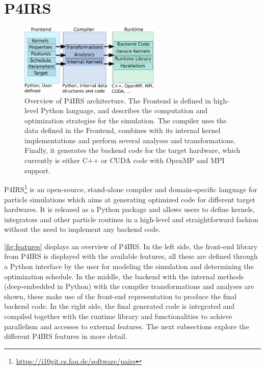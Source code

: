 \documentclass[Afour,sageh,times]{sagej}
\begin{document}
\section{P4IRS}
\label{sec:pairs}


\begin{figure}[htb]
  \centering
  \includegraphics[width=0.6\textwidth]{pairs_overview.png}
  \caption{Overview of P4IRS architecture. The Frontend is defined in high-level Python language, and describes the computation and optimization strategies for the simulation. The compiler uses the data defined in the Frontend, combines with its internal kernel implementations and perform several analyses and transformations. Finally, it generates the backend code for the target hardware, which currently is either C++ or CUDA code with OpenMP and MPI support.}
  \label{fig:features}
\end{figure}

P4IRS\footnote{\url{https://i10git.cs.fau.de/software/pairs}} is an open-source, stand-alone compiler and domain-specific language for particle simulations which aims at generating optimized code for different target hardwares.
It is released as a Python package and allows users to define kernels, integrators and other particle routines in a high-level and straightforward fashion without the need to implement any backend code.

\autoref{fig:features} displays an overview of P4IRS.
In the left side, the front-end library from P4IRS is displayed with the available features, all these are defined through a Python interface by the user for modeling the simulation and determining the optimization schedule.
In the middle, the backend with the internal methods (deep-embedded in Python) with the compiler transformations and analyses are shown, these make use of the front-end representation to produce the final backend code.
In the right side, the final generated code is integrated and compiled together with the runtime library and functionalities to achieve parallelism and accesses to external features.
The next subsections explore the different P4IRS features in more detail.
\end{document}
